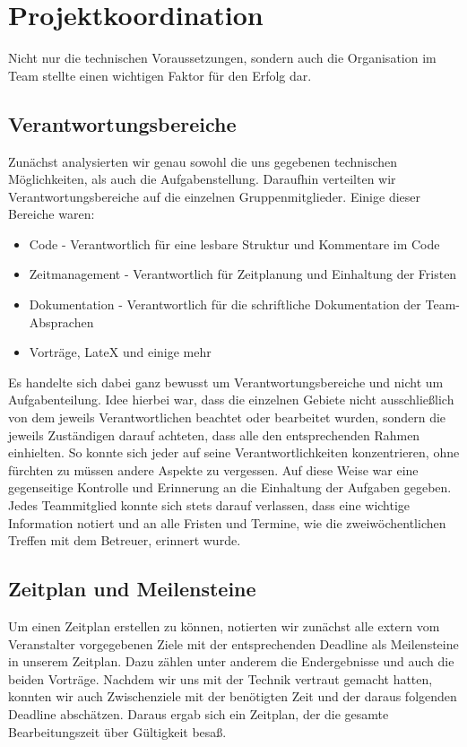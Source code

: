 \section{Projektkoordination}
\label{sec:projektkoordination}

Nicht nur die technischen Voraussetzungen, sondern auch die Organisation im Team stellte einen wichtigen Faktor für den Erfolg dar.

\subsection{Verantwortungsbereiche}
Zunächst analysierten wir genau sowohl die uns gegebenen technischen Möglichkeiten, als auch die Aufgabenstellung. Daraufhin verteilten wir Verantwortungsbereiche auf die einzelnen Gruppenmitglieder. Einige dieser Bereiche waren:
\begin{itemize}
	\item Code - Verantwortlich für eine lesbare Struktur und Kommentare im Code
	\item Zeitmanagement - Verantwortlich für Zeitplanung und Einhaltung der Fristen
	\item Dokumentation - Verantwortlich für die schriftliche Dokumentation der Team-Absprachen
	\item Vorträge, LateX und einige mehr
\end{itemize}
Es handelte sich dabei ganz bewusst um Verantwortungsbereiche und nicht um Aufgabenteilung. Idee hierbei war, dass die einzelnen Gebiete nicht ausschließlich von dem jeweils Verantwortlichen beachtet oder bearbeitet wurden, sondern die jeweils Zuständigen darauf achteten, dass alle den entsprechenden Rahmen einhielten. So konnte sich jeder auf seine Verantwortlichkeiten konzentrieren, ohne fürchten zu müssen andere Aspekte zu vergessen. Auf diese Weise war eine gegenseitige Kontrolle und Erinnerung an die Einhaltung der Aufgaben gegeben. Jedes Teammitglied konnte sich stets darauf verlassen, dass eine wichtige Information notiert und an alle Fristen und Termine, wie die zweiwöchentlichen Treffen mit dem Betreuer, erinnert wurde.


\subsection{Zeitplan und Meilensteine}
Um einen Zeitplan erstellen zu können, notierten wir zunächst alle extern vom Veranstalter vorgegebenen Ziele mit der entsprechenden Deadline als Meilensteine in unserem Zeitplan. Dazu zählen unter anderem die Endergebnisse und auch die beiden Vorträge. Nachdem wir uns mit der Technik vertraut gemacht hatten, konnten wir auch Zwischenziele mit der benötigten Zeit und der daraus folgenden Deadline abschätzen. Daraus ergab sich ein Zeitplan, der die gesamte Bearbeitungszeit über Gültigkeit besaß.
\pagebreak
